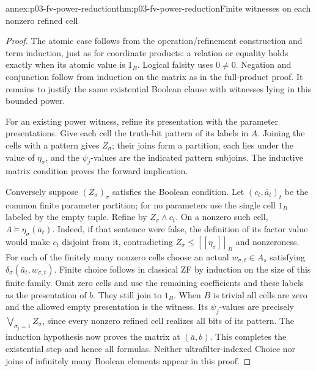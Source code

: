\begin{annexitem}{annex:p03-fv-power-reduction}{thm:p03-fv-power-reduction}{Finite witnesses on each nonzero refined cell}
\begin{proof}
The atomic case follows from the operation/refinement construction and
term induction, just as for coordinate products: a relation or equality
holds exactly when its atomic value is \(1_B\). Logical falsity uses
\(0\ne0\). Negation and conjunction follow from induction on the
matrix as in the full-product proof. It remains to justify the same
existential Boolean clause with witnesses lying in this bounded power.

For an existing power witness, refine its presentation with the parameter
presentations. Give each cell the truth-bit pattern of its labels in \(A\).
Joining the cells with a pattern gives \(Z_\sigma\); their joins form a
partition, each lies under the value of \(\eta_\sigma\), and the
\(\psi_j\)-values are the indicated pattern subjoins. The inductive
matrix condition proves the forward implication.

Conversely suppose \((Z_\sigma)_\sigma\) satisfies the Boolean condition.
Let \((c_t,\bar a_t)_t\) be the common finite parameter partition; for
no parameters use the single cell \(1_B\) labeled by the empty tuple.
Refine by \(Z_\sigma\wedge c_t\). On a nonzero such cell,
\(A\models\eta_\sigma(\bar a_t)\). Indeed, if that sentence were false,
the definition of its factor value would make \(c_t\) disjoint from it,
contradicting \(Z_\sigma\le[\![\eta_\sigma]\!]_B\) and nonzeroness.
For each of the finitely many nonzero cells choose an actual
\(w_{\sigma,t}\in A_s\) satisfying
\(\delta_\sigma(\bar a_t,w_{\sigma,t})\). Finite choice follows in
classical ZF by induction on the size of this finite family.
Omit zero cells and use the remaining coefficients and these labels as the
presentation of \(b\). They still join to \(1_B\). When \(B\) is
trivial all cells are zero and the allowed empty presentation is the witness.
Its \(\psi_j\)-values are precisely \(\bigvee_{\sigma_j=1}Z_\sigma\),
since every nonzero refined cell realizes all bits of its pattern.
The induction hypothesis now proves the matrix at \((\bar a,b)\).
This completes the existential step and hence all formulas. Neither
ultrafilter-indexed Choice nor joins of infinitely many Boolean elements
appear in this proof.
\end{proof}
\end{annexitem}

